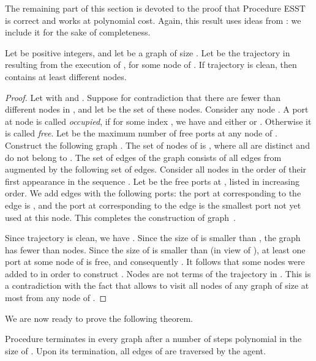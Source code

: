 \documentclass [11pt] {article}
\begin{document}
\vspace*{0.2cm}

{The remaining part of this section is devoted to the proof that Procedure ESST is correct and works at polynomial cost. Again, this result uses  ideas from \cite{DP}: we include it for the sake of completeness.}

\begin{lemma}\label{lemma}
{Let  be positive integers, and let  be a graph of size . Let  be the trajectory in  resulting from the execution of , for some node  of . If trajectory  is clean, then  contains at least  different nodes.}
\end{lemma}

\begin{proof}
{Let  with  and .
Suppose for contradiction that there are fewer than  different nodes in , and let  be the set of these nodes. Consider any node .
A port  at node  is called {\em occupied}, if for some index , we have  and either  or   .
Otherwise it is called {\em free}.
Let  be the maximum number of free ports at any node of .
Construct the following graph . The set of nodes of  is , where all  are distinct and do not belong to . 
The set of edges of the graph  consists of all edges  from  augmented by the following set of edges. Consider all nodes 
in the order of their first appearance in the sequence . Let  be the free ports at , listed in increasing order. We add edges  
with the following ports: the port at  corresponding to the edge   is , and the port at  corresponding to the edge   is the smallest port not yet used
at this node. This completes the construction of graph~.}

{Since trajectory  is clean, we have . Since the size of  is smaller than , the graph  has fewer than  nodes.
Since the size of  is smaller than  (in view of ), at least one port at some node of  is free, and consequently .
It follows that some nodes  were added to  in order to construct .
Nodes  are not terms of the trajectory  in . This is a contradiction with the fact that  allows to visit all nodes of any graph  of size at most  from any node  of .}
\end{proof}

{We are now ready to prove the following theorem.}

\begin{theorem}
\label{theo:est}
{Procedure  terminates in every graph  after a number of steps polynomial in the size of . Upon its termination, all {edges of  are traversed 
by the agent}.}
\end{theorem}
\end{document}
